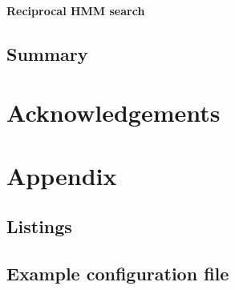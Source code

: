 \documentclass[a4paper,12pt]{scrreprt}
\begin{document}
			\subsubsection{Reciprocal HMM search}
				
	\section{Summary}

%
{}
\chapter*{Acknowledgements}
	
	\clearpage

%
{}
\footnotesize


\normalsize
\clearpage

%
\appendix
\chapter{Appendix}
	\section{Listings}
		
	\section{Example configuration file}
		
\end{document}
